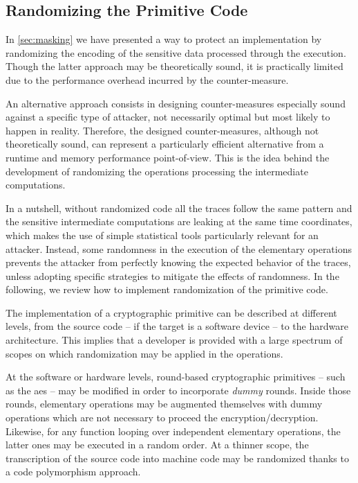 \subsection{Randomizing the Primitive Code}
\label{sec:hiding}
In \autoref{sec:masking} we have presented a way to protect an implementation by randomizing the encoding of the sensitive data processed through the execution.
Though the latter approach may be theoretically sound, it is practically limited due to the performance overhead incurred by the counter-measure.

An alternative approach consists in designing counter-measures especially sound against a specific type of attacker, not necessarily optimal but most likely to happen in reality.
Therefore, the designed counter-measures, although not theoretically sound, can represent a particularly efficient alternative from a runtime and memory performance point-of-view.
This is the idea behind the development of randomizing the operations processing the intermediate computations.

In a nutshell, without randomized code all the traces follow the same pattern and the sensitive intermediate computations are leaking at the same time coordinates, which makes the use of simple statistical tools particularly relevant for an attacker.
Instead, some randomness in the execution of the elementary operations prevents the attacker from perfectly knowing the expected behavior of the traces, unless adopting specific strategies to mitigate the effects of randomness.
In the following, we review how to implement randomization of the primitive code.

The implementation of a cryptographic primitive can be described at different levels, from the source code -- if the target is a software device -- to the hardware architecture.
This implies that a developer is provided with a large spectrum of scopes on which randomization may be applied in the operations.

At the software or hardware levels, round-based cryptographic primitives -- such as the \gls{aes} -- may be modified in order to incorporate \emph{dummy} rounds.
Inside those rounds, elementary operations may be augmented themselves with dummy operations which are not necessary to proceed the encryption/decryption.
Likewise, for any function looping over independent elementary operations, the latter ones may be executed in a random order.
At a thinner scope, the transcription of the source code into machine code may be randomized thanks to a code polymorphism approach.

